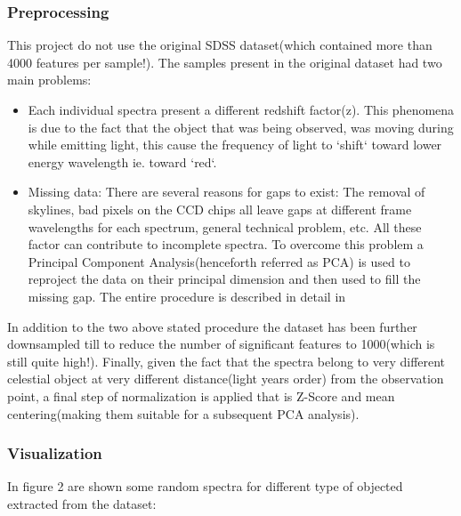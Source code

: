 \documentclass[a4paper,10pt]{article}
\begin{document}
  \subsubsection{Preprocessing}
    This project do not use the original SDSS dataset(which contained more than 4000 features per sample!).\newline
    The samples present in the original dataset had two main problems:
    \begin{itemize}
     \item Each individual spectra present a different redshift factor(z). This phenomena is due to the fact that 
	the object that was being observed, was moving during while emitting light, this cause the frequency of light
	to `shift` toward lower energy wavelength ie. toward `red`.
     
     \item Missing data: There are several reasons for gaps to exist: The removal of skylines,
	bad pixels on the CCD chips all leave gaps at different frame wavelengths for each spectrum, general technical problem, etc. 
	All these factor can contribute to incomplete spectra.\newline
	To overcome this problem a Principal Component Analysis(henceforth referred as PCA) is used to reproject the data
	on their principal dimension and then used to fill the missing gap. The entire procedure is described in detail in \cite{redshift}
    \end{itemize}
    In addition to the two above stated procedure the dataset has been further downsampled till to reduce the number of significant features
    to 1000(which is still quite high!).\newline
    Finally, given the fact that the spectra belong to very different celestial object at very different distance(light years order) from 
    the observation point, a final step of normalization is applied that is Z-Score and mean centering(making them suitable for a subsequent PCA analysis).
  
  \subsubsection{Visualization}
    In figure 2 are shown some random spectra for different type of objected extracted from the dataset:
    
\end{document}
